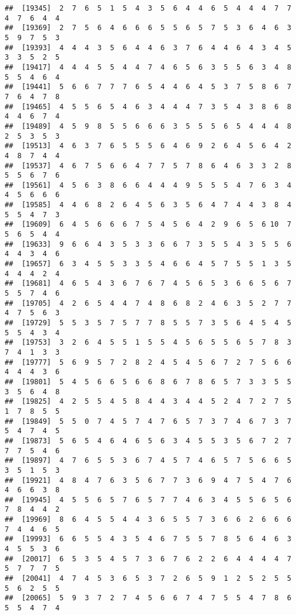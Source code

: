 \documentclass[
]{book}
\begin{document}
\begin{verbatim}
##  [19345]  2  7  6  5  1  5  4  3  5  6  4  4  6  5  4  4  4  7  7  4  7  6  4  4
##  [19369]  2  7  5  6  4  6  6  6  5  5  6  5  7  5  3  6  4  6  3  5  9  7  5  3
##  [19393]  4  4  4  3  5  6  4  4  6  3  7  6  4  4  6  4  3  4  5  3  3  5  2  5
##  [19417]  4  4  4  5  5  4  4  7  4  6  5  6  3  5  5  6  3  4  8  5  5  4  6  4
##  [19441]  5  6  6  7  7  7  6  5  4  4  6  4  5  3  7  5  8  6  7  7  6  4  7  8
##  [19465]  4  5  5  6  5  4  6  3  4  4  4  7  3  5  4  3  8  6  8  4  4  6  7  4
##  [19489]  4  5  9  8  5  5  6  6  6  3  5  5  5  6  5  4  4  4  8  2  5  3  5  3
##  [19513]  4  6  3  7  6  5  5  5  6  4  6  9  2  6  4  5  6  4  2  4  8  7  4  4
##  [19537]  4  6  7  5  6  6  4  7  7  5  7  8  6  4  6  3  3  2  8  5  5  6  7  6
##  [19561]  4  5  6  3  8  6  6  4  4  4  9  5  5  5  4  7  6  3  4  4  5  6  6  6
##  [19585]  4  4  6  8  2  6  4  5  6  3  5  6  4  7  4  4  3  8  4  5  5  4  7  3
##  [19609]  6  4  5  6  6  6  7  5  4  5  6  4  2  9  6  5  6 10  7  5  6  5  4  4
##  [19633]  9  6  6  4  3  5  3  3  6  6  7  3  5  5  4  3  5  5  6  4  4  3  4  6
##  [19657]  6  3  4  5  5  3  3  5  4  6  6  4  5  7  5  5  1  3  5  4  4  4  2  4
##  [19681]  4  6  5  4  3  6  7  6  7  4  5  6  5  3  6  6  5  6  7  5  5  7  4  6
##  [19705]  4  2  6  5  4  4  7  4  8  6  8  2  4  6  3  5  2  7  7  4  7  5  6  3
##  [19729]  5  5  3  5  7  5  7  7  8  5  5  7  3  5  6  4  5  4  5  5  5  4  3  4
##  [19753]  3  2  6  4  5  5  1  5  5  4  5  6  5  5  6  5  7  8  3  7  4  1  3  3
##  [19777]  5  6  9  5  7  2  8  2  4  5  4  5  6  7  2  7  5  6  6  4  4  4  3  6
##  [19801]  5  4  5  6  6  5  6  6  8  6  7  8  6  5  7  3  3  5  5  3  5  6  4  8
##  [19825]  4  2  5  5  4  5  8  4  4  3  4  4  5  2  4  7  2  7  5  1  7  8  5  5
##  [19849]  5  5  0  7  4  5  7  4  7  6  5  7  3  7  4  6  7  3  7  5  4  7  4  5
##  [19873]  5  6  5  4  6  4  6  5  6  3  4  5  5  3  5  6  7  2  7  7  7  5  4  6
##  [19897]  4  7  6  5  5  3  6  7  4  5  7  4  6  5  7  5  6  6  5  3  5  1  5  3
##  [19921]  4  8  4  7  6  3  5  6  7  7  3  6  9  4  7  5  4  7  6  4  6  6  3  8
##  [19945]  4  5  5  6  5  7  6  5  7  7  4  6  3  4  5  5  6  5  6  7  8  4  4  2
##  [19969]  8  6  4  5  5  4  4  3  6  5  5  7  3  6  6  2  6  6  6  7  4  4  6  5
##  [19993]  6  6  5  5  4  3  5  4  6  7  5  5  7  8  5  6  4  6  3  4  5  5  3  6
##  [20017]  6  5  3  5  4  5  7  3  6  7  6  2  2  6  4  4  4  4  7  5  7  7  7  5
##  [20041]  4  7  4  5  3  6  5  3  7  2  6  5  9  1  2  5  2  5  5  5  6  2  5  5
##  [20065]  5  9  3  7  2  7  4  5  6  6  7  4  7  5  5  4  7  8  6  5  5  4  7  4

\end{verbatim}
\end{document}
